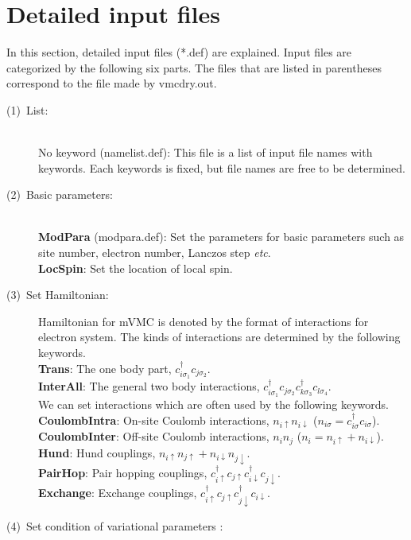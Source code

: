 \newpage
\section{Detailed input files}
\label{Ch:HowToExpert}
In this section, detailed input files (*.def) are explained. Input files are categorized by the following six parts.
The files that are listed in parentheses correspond to the file made by vmcdry.out.

\begin{description}
\item[(1)~List:]
~\\{No keyword} (namelist.def):
This file is a list of input file names with keywords. Each keywords is fixed, but file names are free to be determined.  
\item[(2)~Basic parameters:]
~\\{\bf ModPara} (modpara.def): Set the parameters for basic parameters such as site number, electron number, Lanczos step {\it etc}.
~\\{\bf LocSpin}: Set the location of local spin. 
\item[(3)~Set Hamiltonian:] 
Hamiltonian for mVMC is denoted by the format of interactions for electron system. 
The kinds of interactions are determined by the following keywords. 
~\\{\bf Trans}: The one body part, $c_{i\sigma_1}^{\dag}c_{j\sigma_2}$.
~\\{\bf InterAll}: The general two body interactions, $c_ {i \sigma_1}^{\dag}c_{j\sigma_2}c_{k \sigma_3}^{\dag}c_{l \sigma_4}$.
~\\We can set interactions which are often used by the following keywords. 
~\\{\bf CoulombIntra}: On-site Coulomb interactions, $n_ {i \uparrow}n_{i \downarrow}$ ($n_{i \sigma}=c_{i\sigma}^{\dag}c_{i\sigma}$).
~\\{\bf CoulombInter}: Off-site Coulomb interactions, $n_ {i}n_{j}$ ($n_i=n_{i\uparrow}+n_{i\downarrow}$).
~\\{\bf Hund}: Hund couplings, $n_{i\uparrow}n_{j\uparrow}+n_{i\downarrow}n_{j\downarrow}$.
~\\{\bf PairHop}: Pair hopping couplings, $c_ {i \uparrow}^{\dag}c_{j\uparrow}c_{i \downarrow}^{\dag}c_{j  \downarrow}$.
~\\{\bf Exchange}: Exchange couplings, $c_ {i \uparrow}^{\dag}c_{j\uparrow}c_{j \downarrow}^{\dag}c_{i  \downarrow}$.
\item[(4)~Set condition of variational parameters :] 

\end{description}
